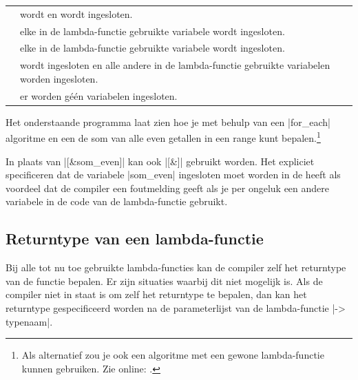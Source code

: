 \begin{cpplstShortInline}
\begin{tabularx}{\textwidth}{lX}
	\hspace{1em}{} \code{[a, \&b]} & \code{a} wordt \squote{by value} en \code{b} wordt \squote{by reference} ingesloten.\\
	\hspace{1em}{} \code{[\&]} & elke in de lambda-functie gebruikte variabele wordt \squote{by reference} ingesloten.\\
	\hspace{1em}{} \code{[=]} & elke in de lambda-functie gebruikte variabele wordt \squote{by value} ingesloten.\\
	\hspace{1em}{} \code{[=, \&c]} & \code{c} wordt \squote{by reference} ingesloten en alle andere in de lambda-functie gebruikte variabelen worden \squote{by value} ingesloten.\\
	\hspace{1em}{} \code{[]} & er worden géén variabelen ingesloten.
\end{tabularx}

Het onderstaande programma  laat zien hoe je met behulp van een |for_each| algoritme en een  de som van alle even getallen in een range kunt bepalen.\footnote{%
	Als alternatief zou je ook een  algoritme met een gewone lambda\hyp{}functie kunnen gebruiken.
	Zie online: .
}


In plaats van |[&som_even]| kan ook |[&]| gebruikt worden.
Het expliciet specificeren dat de variabele |som_even| ingesloten moet worden in de  heeft als voordeel dat de compiler een foutmelding geeft als je per ongeluk een andere variabele in de code van de lambda-functie gebruikt.

\subsection{Returntype van een lambda\hyp{}functie}
\label{sec:returntypelambda}
Bij alle tot nu toe gebruikte lambda\hyp{}functies kan de compiler zelf het returntype van de functie bepalen.
Er zijn situaties waarbij dit niet mogelijk is.
Als de compiler niet in staat is om zelf het returntype te bepalen, dan kan het returntype gespecificeerd worden na de parameterlijst van de lambda\hyp{}functie |-> typenaam|.


\end{cpplstShortInline}
